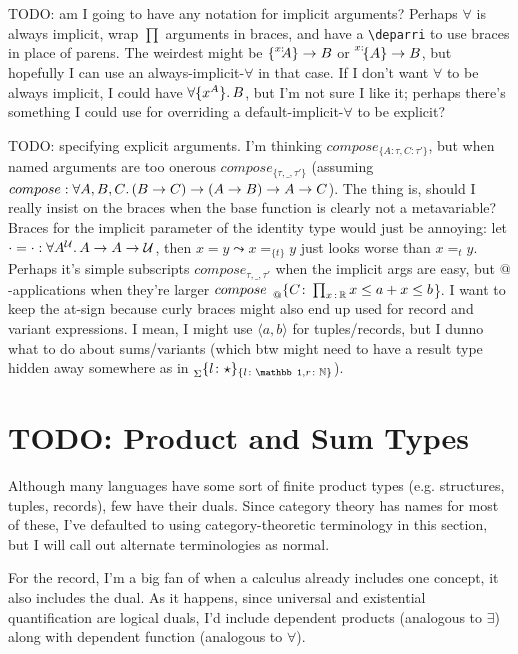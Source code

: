\documentclass[11pt]{article} %
\theoremstyle{definition}
\theoremstyle{remark}
\begin{document}
TODO: am I going to have any notation for implicit arguments?
Perhaps $\forall$ is always implicit, wrap $\prod$ arguments in braces, and have a \verb|\deparri| to use braces in place of parens.
The weirdest might be $\{\prescript{x\mathord:\!\!}{}{A}\} \to B$ or $\prescript{{x}\mathord:\!{}}{}{{\{A\}}} \to B$, but hopefully I can use an always-implicit-$\forall$ in that case.
If I don't want $\forall$ to be always implicit, I could have ${\forall}{\{x^A\}}.\,B$, but I'm not sure I like it; perhaps there's something I could use for overriding a default-implicit-$\forall$ to be explicit?

TODO: specifying explicit arguments.
I'm thinking $compose_{\{A\colon \tau,C\colon \tau'\}}$, but when named arguments are too onerous $compose_{\{\tau,\_,\tau'\}}$ (assuming $compose : {\forall}{A,B,C}.\, (B \to C) \to (A \to B) \to A \to C$).
The thing is, should I really insist on the braces when the base function is clearly not a metavariable?
Braces for the implicit parameter of the identity type would just be annoying: let $\cdot=\cdot : {\forall}{A^{\mathcal{U}}}.\,A \to A \to \mathcal{U}$, then $x = y \leadsto x =_{\{t\}} y$ just looks worse than $x =_{t} y$.
Perhaps it's simple subscripts $compose_{\tau,\_,\tau'}$ when the implicit args are easy, but $@$-applications when they're larger $compose\;\prescript{}{@}\{C\colon \Pitype{x}{\mathbb R} x \leq a + x \leq b$\}.
I want to keep the at-sign because curly braces might also end up used for record and variant expressions.
I mean, I might use $\langle a, b \rangle$ for tuples/records, but I dunno what to do about sums/variants (which btw might need to have a result type hidden away somewhere as in $\prescript{}{\Sigma}\{l\colon \star\}_{\{l\colon \mathbb 1, r\colon \mathbb N\}}$).


\section{TODO: Product and Sum Types}
\label{sec:prod-sum-types}

Although many languages have some sort of finite product types (e.g. structures, tuples, records), few have their duals.
Since category theory has names for most of these, I've defaulted to using category-theoretic terminology in this section, but I will call out alternate terminologies as normal.

For the record, I'm a big fan of when a calculus already includes one concept, it also includes the dual.
As it happens, since universal and existential quantification are logical duals, I'd include dependent products (analogous to $\exists$) along with dependent function (analogous to $\forall$).
\end{document}
